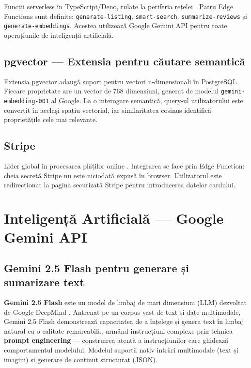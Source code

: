 \documentclass[12pt,a4paper,oneside]{report}
\begin{document}
Funcții serverless în TypeScript/Deno, rulate la periferia rețelei \cite{supabase-edge}. Patru Edge Functions sunt definite: \texttt{generate-listing}, \texttt{smart-search}, \texttt{summarize-reviews} și \texttt{generate-embeddings}. Acestea utilizează Google Gemini API pentru toate operațiunile de inteligență artificială.

\subsection{pgvector — Extensia pentru căutare semantică}

Extensia pgvector adaugă suport pentru vectori n-dimensionali în PostgreSQL \cite{pgvector}. Fiecare proprietate are un vector de 768 dimensiuni, generat de modelul \texttt{gemini-embedding-001} al Google. La o interogare semantică, query-ul utilizatorului este convertit în același spațiu vectorial, iar similaritatea cosinus identifică proprietățile cele mai relevante.

\subsection{Stripe}

Lider global în procesarea plăților online \cite{stripe}. Integrarea se face prin Edge Function: cheia secretă Stripe nu este niciodată expusă în browser. Utilizatorul este redirecționat la pagina securizată Stripe pentru introducerea datelor cardului.


\section{Inteligență Artificială — Google Gemini API}

\subsection{Gemini 2.5 Flash pentru generare și sumarizare text}

\textbf{Gemini 2.5 Flash} este un model de limbaj de mari dimensiuni (LLM) dezvoltat de Google DeepMind \cite{gemini}. Antrenat pe un corpus vast de text și date multimodale, Gemini 2.5 Flash demonstrează capacitatea de a înțelege și genera text în limbaj natural cu o calitate remarcabilă, urmând instrucțiuni complexe prin tehnica \textbf{prompt engineering} — construirea atentă a instrucțiunilor care ghidează comportamentul modelului. Modelul suportă nativ intrări multimodale (text și imagini) și generare de conținut structurat (JSON).
\end{document}
